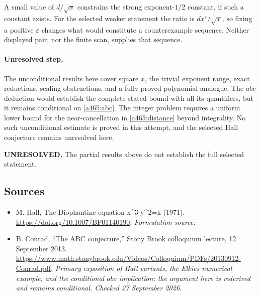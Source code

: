 \documentclass[11pt]{article}
\begin{document}
A small value of $d/\sqrt x$ constrains the strong exponent-$1/2$ constant, if such a constant exists. For the selected weaker statement the ratio is $d x^{\varepsilon}/\sqrt x$, so fixing a positive $\varepsilon$ changes what would constitute a counterexample sequence. Neither displayed pair, nor the finite scan, supplies that sequence.

\paragraph{Unresolved step.}
The unconditional results here cover square $x$, the trivial exponent range, exact reductions, scaling obstructions, and a fully proved polynomial analogue. The $abc$ deduction would establish the complete stated bound with all its quantifiers, but it remains conditional on \eqref{a465:abc}. The integer problem requires a uniform lower bound for the near-cancellation in \eqref{a465:distance} beyond integrality. No such unconditional estimate is proved in this attempt, and the selected Hall conjecture remains unresolved here.

\textbf{UNRESOLVED.} The partial results above do not establish the full selected statement.

\subsection{Sources}
\begin{itemize}
\item[S1]M. Hall, The Diophantine equation x\textasciicircum{}3-y\textasciicircum{}2=k (1971).
\url{https://doi.org/10.1007/BF01140190}.
\textit{Formulation source.}
\item[E1] B. Conrad, ``The ABC conjecture,'' Stony Brook colloquium lecture, 12 September 2013.
\url{https://www.math.stonybrook.edu/Videos/Colloquium/PDFs/20130912-Conrad.pdf}.
\textit{Primary exposition of Hall variants, the Elkies numerical example, and the conditional $abc$ implication; the argument here is rederived and remains conditional. Checked 27 September 2026.}
\end{itemize}
\end{document}
